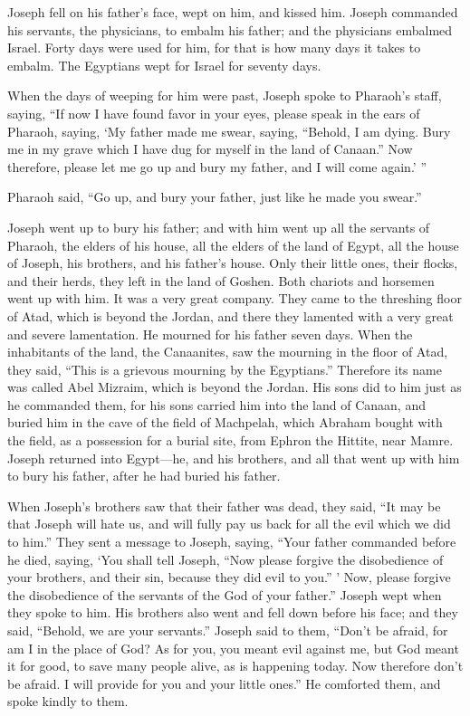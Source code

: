 \mychapter{}
\myverse*{}Joseph fell on his father’s face, wept on him, and kissed him. \myverse{}Joseph commanded his servants, the physicians, to embalm his father; and the physicians embalmed Israel. \myverse{}Forty days were used for him, for that is how many days it takes to embalm. The Egyptians wept for Israel for seventy days.

\myverse{}When the days of weeping for him were past, Joseph spoke to Pharaoh’s staff, saying, “If now I have found favor in your eyes, please speak in the ears of Pharaoh, saying, \myverse{}‘My father made me swear, saying, “Behold, I am dying. Bury me in my grave which I have dug for myself in the land of Canaan.” Now therefore, please let me go up and bury my father, and I will come again.’ ”

\myverse{}Pharaoh said, “Go up, and bury your father, just like he made you swear.”

\myverse{}Joseph went up to bury his father; and with him went up all the servants of Pharaoh, the elders of his house, all the elders of the land of Egypt, \myverse{}all the house of Joseph, his brothers, and his father’s house. Only their little ones, their flocks, and their herds, they left in the land of Goshen. \myverse{}Both chariots and horsemen went up with him. It was a very great company. \myverse{}They came to the threshing floor of Atad, which is beyond the Jordan, and there they lamented with a very great and severe lamentation. He mourned for his father seven days. \myverse{}When the inhabitants of the land, the Canaanites, saw the mourning in the floor of Atad, they said, “This is a grievous mourning by the Egyptians.” Therefore its name was called Abel Mizraim, which is beyond the Jordan. \myverse{}His sons did to him just as he commanded them, \myverse{}for his sons carried him into the land of Canaan, and buried him in the cave of the field of Machpelah, which Abraham bought with the field, as a possession for a burial site, from Ephron the Hittite, near Mamre. \myverse{}Joseph returned into Egypt—he, and his brothers, and all that went up with him to bury his father, after he had buried his father.

\myverse{}When Joseph’s brothers saw that their father was dead, they said, “It may be that Joseph will hate us, and will fully pay us back for all the evil which we did to him.”  \myverse{}They sent a message to Joseph, saying, “Your father commanded before he died, saying,  \myverse{}‘You shall tell Joseph, “Now please forgive the disobedience of your brothers, and their sin, because they did evil to you.” ’ Now, please forgive the disobedience of the servants of the God of your father.” Joseph wept when they spoke to him. \myverse{}His brothers also went and fell down before his face; and they said, “Behold, we are your servants.” \myverse{}Joseph said to them, “Don’t be afraid, for am I in the place of God? \myverse{}As for you, you meant evil against me, but God meant it for good, to save many people alive, as is happening today. \myverse{}Now therefore don’t be afraid. I will provide for you and your little ones.” He comforted them, and spoke kindly to them.

